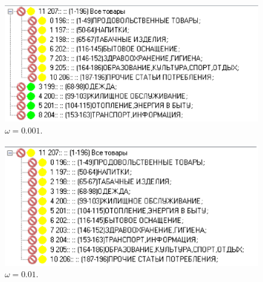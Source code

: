 \documentclass[12pt]{article}
\theoremstyle{rusdef}
\begin{document}
\begin{figure}[h!]
	\centering
	\includegraphics[scale=0.8]{pics/w0.001.eps}
	\caption{$\omega = 0.001$.}
\end{figure}
\begin{figure}[h!]
	\centering
	\includegraphics[scale=0.8]{pics/w0.01.eps}
	\caption{$\omega = 0.01$.}
\end{figure}
\end{document}
